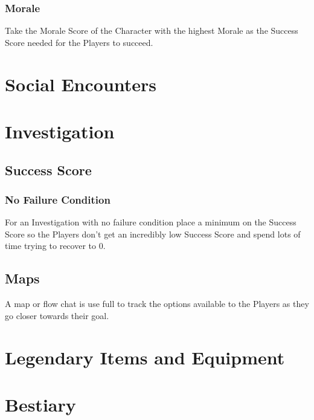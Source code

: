 \documentclass[a4paper,12pt,oneside]{book}
\begin{document}
                \subsubsection{Morale}
                    Take the Morale Score of the Character with the highest Morale as the Success Score needed for the Players to succeed.
        \section{Social Encounters}

        \section{Investigation}
            \subsection{Success Score}
                \subsubsection{No Failure Condition}
                    For an Investigation with no failure condition place a minimum on the Success Score so the Players don't get an incredibly low Success Score and spend lots of time trying to recover to 0.

            \subsection{Maps}
                A map or flow chat is use full to track the options available to the Players as they go closer towards their goal.

        \section{Legendary Items and Equipment}
        \section{Bestiary}




    \appendix

    \backmatter
    {}
    
    \printindex
\end{document}
